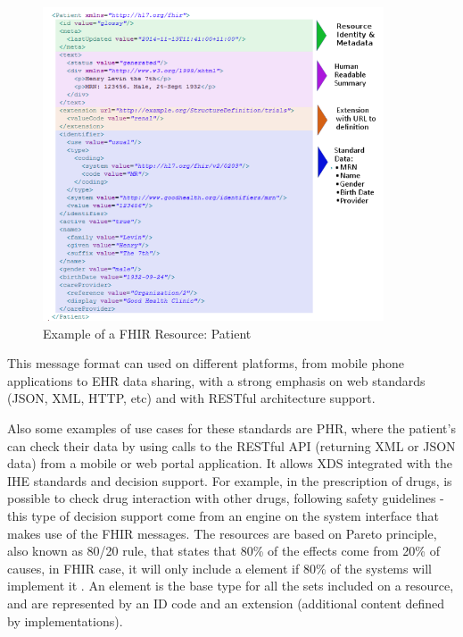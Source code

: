 \documentclass[mim_thesis.tex]{subfiles}
\begin{document}
\begin{figure}[H]
	\centering
    \includegraphics[width=0.9\textwidth]{img/fhir_patient.PNG}
	\caption{Example of a FHIR Resource: Patient \citep{FHIR2017}}
	\label{fig:fhir_patient}
\end{figure}

This message format can used on different platforms, from mobile phone applications to EHR data sharing, with a strong emphasis on web standards (JSON, XML, HTTP, etc) and with RESTful architecture support.
  
Also some examples of use cases for these standards are \ac{PHR}, where the patient’s can check their data by using calls to the RESTful API (returning XML or JSON data) from a mobile or web portal application. It allows \ac{XDS} integrated with the IHE standards and decision support. For example, in the prescription of drugs, is possible to check drug interaction with other drugs, following safety guidelines - this type of decision support come from an engine on the system interface that makes use of the FHIR messages. The resources are based on Pareto principle, also known as 80/20 rule, that states that 80\% of the effects come from 20\% of causes, in FHIR case, it will only include a element if 80\% of the systems will implement it \citep{hl7fhir2017}. An element is the base type for all the sets included on a resource, and are represented by an ID code and an extension (additional content defined by implementations).   
\end{document}
